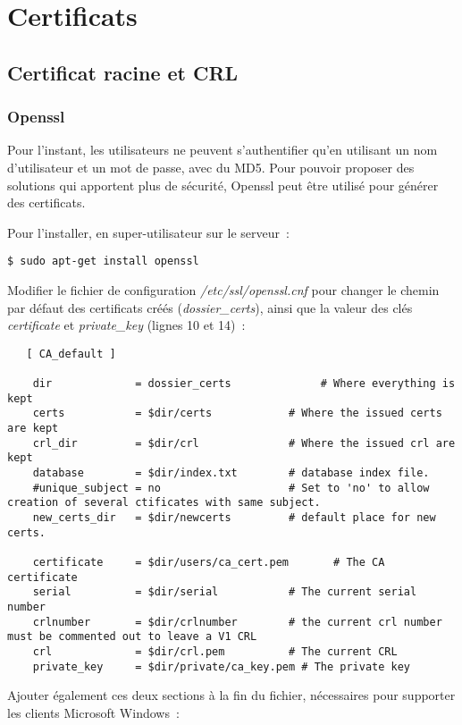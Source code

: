 \section{Certificats}
\subsection{Certificat racine et CRL}
\subsubsection{Openssl}

Pour l'instant, les utilisateurs ne peuvent s'authentifier qu'en utilisant un nom d'utilisateur et un mot de passe, avec du MD5. Pour pouvoir proposer des solutions qui apportent plus de sécurité, Openssl peut être utilisé pour générer des certificats.

Pour l'installer, en super-utilisateur sur le serveur~:

\begin{lstlisting}
$ sudo apt-get install openssl
\end{lstlisting}

Modifier le fichier de configuration \emph{/etc/ssl/openssl.cnf} pour changer le chemin par défaut des certificats créés (\emph{dossier\_certs}), ainsi que la valeur des clés \emph{certificate} et \emph{private\_key} (lignes 10 et 14)~:

\begin{lstlisting}
   [ CA_default ]

    dir             = dossier_certs              # Where everything is kept
    certs           = $dir/certs            # Where the issued certs are kept
    crl_dir         = $dir/crl              # Where the issued crl are kept
    database        = $dir/index.txt        # database index file.
    #unique_subject = no                    # Set to 'no' to allow creation of several ctificates with same subject.
    new_certs_dir   = $dir/newcerts         # default place for new certs.

    certificate     = $dir/users/ca_cert.pem       # The CA certificate
    serial          = $dir/serial           # The current serial number
    crlnumber       = $dir/crlnumber        # the current crl number must be commented out to leave a V1 CRL
    crl             = $dir/crl.pem          # The current CRL
    private_key     = $dir/private/ca_key.pem # The private key
\end{lstlisting}

Ajouter également ces deux sections à la fin du fichier, nécessaires pour supporter les clients Microsoft Windows~:

